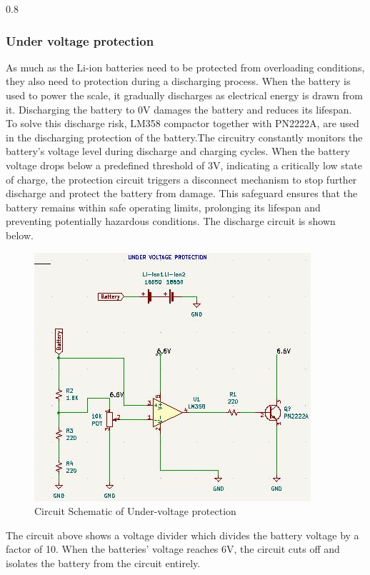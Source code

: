 \documentclass[class=report,11pt,crop=false]{standalone}
\begin{document}
\begin{table}[h!]
\begin{tabularx}{0.8\textwidth}
{{	\subsubsection{Under voltage protection}
	\vspace{0.5cm}
	As much as the Li-ion batteries need to be protected from overloading conditions, they also need to protection during a discharging process. When the battery is used to power the scale, it gradually discharges as electrical energy is drawn from it. Discharging the battery to 0V damages the battery and reduces its lifespan. To solve this discharge risk, LM358 compactor together with PN2222A, are used in the discharging protection of the battery.The circuitry constantly monitors the battery's voltage level during discharge and charging cycles. When the battery voltage drops below a predefined threshold of 3V, indicating a critically low state of charge, the protection circuit triggers a disconnect mechanism to stop further discharge and protect the battery from damage. This safeguard ensures that the battery remains within safe operating limits, prolonging its lifespan and preventing potentially hazardous conditions. The discharge circuit is shown below. 
	
	\begin{figure}[h!]
		\centering
		\includegraphics[width=0.9\linewidth]{Figures/ReverseVoltageCircuit.jpg}
		\caption{Circuit Schematic of Under-voltage protection}
		\label{fig:P4}
	\end{figure}
	
	The circuit above shows a voltage divider which divides the battery voltage by a factor of 10. When the batteries' voltage reaches 6V, the circuit cuts off and isolates the battery from the circuit entirely.
	
}}
\end{tabularx}
\end{table}
\end{document}
